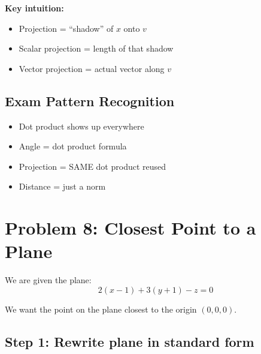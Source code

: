 \documentclass[11pt]{article}
\begin{document}
\begin{center}
\end{center}

\textbf{Key intuition:}
\begin{itemize}
    \item Projection = ``shadow'' of $x$ onto $v$
    \item Scalar projection = length of that shadow
    \item Vector projection = actual vector along $v$
\end{itemize}

\hrulefill

\subsection*{Exam Pattern Recognition}

\begin{itemize}
    \item Dot product shows up everywhere
    \item Angle = dot product formula
    \item Projection = SAME dot product reused
    \item Distance = just a norm
\end{itemize}

\hrulefill

\section*{Problem 8: Closest Point to a Plane}

We are given the plane:
\[
2(x - 1) + 3(y + 1) - z = 0
\]

We want the point on the plane closest to the origin $(0,0,0)$.

\hrulefill

\subsection*{Step 1: Rewrite plane in standard form}
\end{document}

